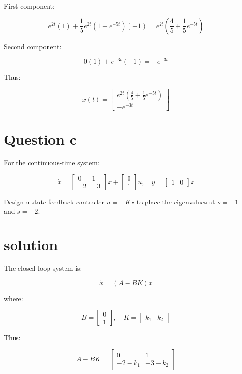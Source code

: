 \documentclass[12pt]{article}
\begin{document}
	First component:
	
	\[
	e^{2t}(1) + \frac{1}{5}e^{2t}(1 - e^{-5t})(-1) = e^{2t} \left( \frac{4}{5} + \frac{1}{5}e^{-5t} \right)
	\]
	
	Second component:
	
	\[
	0(1) + e^{-3t}(-1) = -e^{-3t}
	\]
	
	Thus:
	
	\[
	\boxed{
		x(t) = 
		\begin{bmatrix}
			e^{2t} \left( \frac{4}{5} + \frac{1}{5}e^{-5t} \right) \\
			-e^{-3t}
		\end{bmatrix}
	}
	\]
	
	\newpage
	
	\section*{Question c}
	
	For the continuous-time system:
	
	\[
	\dot{x} = 
	\begin{bmatrix}
		0 & 1 \\ 
		-2 & -3
	\end{bmatrix} x +
	\begin{bmatrix}
		0 \\ 
		1
	\end{bmatrix} u,
	\quad
	y = 
	\begin{bmatrix}
		1 & 0
	\end{bmatrix} x
	\]
	
	Design a state feedback controller \(u = -Kx\) to place the eigenvalues at \(s = -1\) and \(s = -2\).
	
	\section*{solution}
	
	The closed-loop system is:
	
	\[
	\dot{x} = (A - BK)x
	\]
	
	where:
	
	\[
	B = 
	\begin{bmatrix}
		0 \\ 1
	\end{bmatrix},
	\quad
	K = 
	\begin{bmatrix}
		k_1 & k_2
	\end{bmatrix}
	\]
	
	Thus:
	
	\[
	A - BK =
	\begin{bmatrix}
		0 & 1 \\
		-2 - k_1 & -3 - k_2
	\end{bmatrix}
	\]
	
\end{document}
